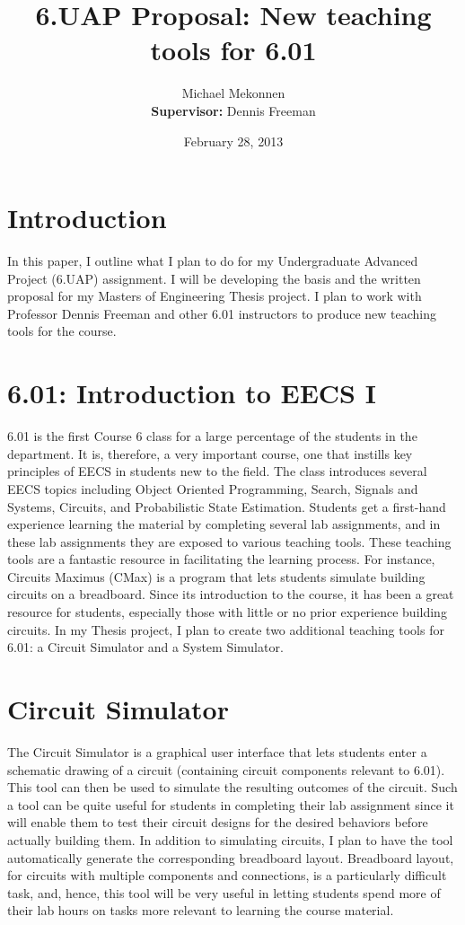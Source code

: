 \documentclass[12pt]{amsart}
\title{6.UAP Proposal: New teaching tools for 6.01}
\author{Michael Mekonnen \\ \textbf{Supervisor:} Dennis Freeman}
\date{February 28, 2013}
\begin{document}
\maketitle

\section{Introduction}

In this paper, I outline what I plan to do for my Undergraduate Advanced Project (6.UAP) assignment. I will be developing the basis and the written proposal for my Masters of Engineering Thesis project. I plan to work with Professor Dennis Freeman and other 6.01 instructors to produce new teaching tools for the course.

\section{6.01: Introduction to EECS I}

6.01 is the first Course 6 class for a large percentage of the students in the department. It is, therefore, a very important course, one that instills key principles of EECS in students new to the field. The class introduces several EECS topics including Object Oriented Programming, Search, Signals and Systems, Circuits, and Probabilistic State Estimation. Students get a first-hand experience learning the material by completing several lab assignments, and in these lab assignments they are exposed to various teaching tools. These teaching tools are a fantastic resource in facilitating the learning process. For instance, Circuits Maximus (CMax) is a program that lets students simulate building circuits on a breadboard. Since its introduction to the course, it has been a great resource for students, especially those  with little or no prior experience building circuits. In my Thesis project, I plan to create two additional teaching tools for 6.01: a Circuit Simulator and a System Simulator.

\section{Circuit Simulator}
The Circuit Simulator is a graphical user interface that lets students enter a schematic drawing of a circuit (containing circuit components relevant to 6.01). This tool can then be used to simulate the resulting outcomes of the circuit. Such a tool can be quite useful for students in completing their lab assignment since it will enable them to test their circuit designs for the desired behaviors before actually building them. In addition to simulating circuits, I plan to have the tool automatically generate the corresponding breadboard layout. Breadboard layout, for circuits with multiple components and connections, is a particularly difficult task, and, hence, this tool will be very useful in letting students spend more of their lab hours on tasks more relevant to learning the course material.
\end{document}
